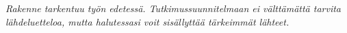 \documentclass[12pt,a4paper,finnish,oneside]{article}
\begin{document}
%

\emph{Rakenne tarkentuu työn edetessä. Tutkimussuunnitelmaan ei välttämättä tarvita lähdeluetteloa, mutta halutessasi voit sisällyttää tärkeimmät lähteet.}

%


% 

\renewcommand{\refname}{Lähteet}  %



\end{document}
